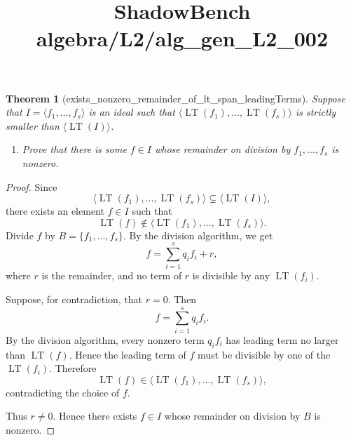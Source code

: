 \documentclass{article}
\title{ShadowBench algebra/L2/alg\_gen\_L2\_002}
\newtheorem{theorem}{Theorem}
\begin{document}
\maketitle

\begin{theorem}[exists_nonzero_remainder_of_lt_span_leadingTerms]
Suppose that $I=\langle f_1,\dots,f_s\rangle$ is an ideal such that $\langle \operatorname{LT}(f_1),\dots,\operatorname{LT}(f_s)\rangle$ is strictly smaller than $\langle \operatorname{LT}(I)\rangle$.
\begin{enumerate}
\item[(a)] Prove that there is some $f\in I$ whose remainder on division by $f_1,\dots,f_s$ is nonzero.
\end{enumerate}
\end{theorem}

\begin{proof}
Since
\[
  \langle \operatorname{LT}(f_1),\ldots,\operatorname{LT}(f_s)\rangle
  \subsetneq
  \langle \operatorname{LT}(I)\rangle,
\]
there exists an element \(f\in I\) such that
\[
  \operatorname{LT}(f)\notin
  \langle \operatorname{LT}(f_1),\ldots,\operatorname{LT}(f_s)\rangle .
\]
Divide \(f\) by \(B=\{f_1,\ldots,f_s\}\). By the division algorithm, we get
\[
  f=\sum_{i=1}^s q_i f_i+r,
\]
where \(r\) is the remainder, and no term of \(r\) is divisible by any
\(\operatorname{LT}(f_i)\).

Suppose, for contradiction, that \(r=0\). Then
\[
  f=\sum_{i=1}^s q_i f_i.
\]
By the division algorithm, every nonzero term \(q_i f_i\) has leading term no larger
than \(\operatorname{LT}(f)\). Hence the leading term of \(f\) must be divisible by
one of the \(\operatorname{LT}(f_i)\). Therefore
\[
  \operatorname{LT}(f)\in
  \langle \operatorname{LT}(f_1),\ldots,\operatorname{LT}(f_s)\rangle,
\]
contradicting the choice of \(f\).

Thus \(r\neq 0\). Hence there exists \(f\in I\) whose remainder on division by
\(B\) is nonzero.
\end{proof}
\end{document}
